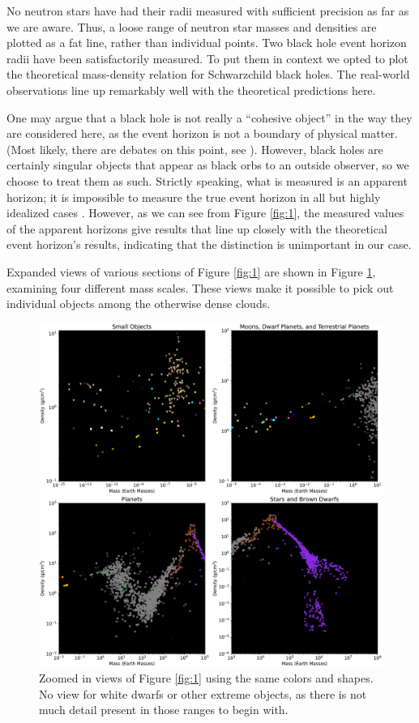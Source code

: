 \documentclass[twocolumn,linenumbers]{aastex631}
\begin{document}
No neutron stars have had their radii measured with sufficient precision as far as we are aware. Thus, a loose range of neutron star masses and densities are plotted as a fat line, rather than individual points. Two black hole event horizon radii have been satisfactorily measured. To put them in context we opted to plot the theoretical mass-density relation for Schwarzchild black holes. The real-world observations line up remarkably well with the theoretical predictions here.

One may argue that a black hole is not really a ``cohesive object'' in the way they are considered here, as the event horizon is not a boundary of physical matter. (Most likely, there are debates on this point, see \cite{Mann2022}). However, black holes are certainly singular objects that appear as black orbs to an outside observer, so we choose to treat them as such. Strictly speaking, what is measured is an apparent horizon; it is impossible to measure the true event horizon in all but highly idealized cases \citep{Visser2014}. However, as we can see from Figure \ref{fig:1}, the measured values of the apparent horizons give results that line up closely with the theoretical event horizon's results, indicating that the distinction is unimportant in our case.

Expanded views of various sections of Figure \ref{fig:1} are shown in Figure \ref{fig:2}, examining four different mass scales. These views make it possible to pick out individual objects among the otherwise dense clouds.  

\begin{figure}[htbp]
\centering
\includegraphics[scale = 0.45]{ZoomViews.pdf}
\centering
\caption{Zoomed in views of Figure \ref{fig:1} using the same colors and shapes. No view for white dwarfs or other extreme objects, as there is not much detail present in those ranges to begin with.}
\label{fig:2}
\end{figure}
\end{document}
